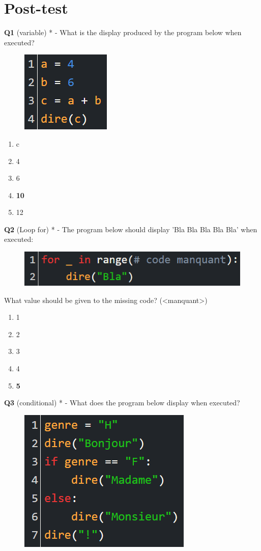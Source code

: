 \documentclass[14pt]{extarticle}
\begin{document}
\section{Post-test}
\textbf{Q1} (variable) * - What is the display produced by the program below when executed?
\begin{figure}[H]
    \centering
    \includegraphics[width=0.25\linewidth]{images/posttest/_Q1.png}
\end{figure}

\begin{enumerate}[label=\alph*)]
    \item c
    \item 4
    \item 6
    \item \textbf{10}
    \item 12
\end{enumerate}
\newpage
\textbf{Q2} (Loop for) * - The program below should display 'Bla Bla Bla Bla Bla' when executed:
\begin{figure}[H]
    \centering
    \includegraphics[width=0.7\linewidth]{images/posttest/_Q2.png}
\end{figure}
What value should be given to the missing code? (<manquant>)
\begin{enumerate}[label=\alph*)]
    \item 1
    \item 2
    \item 3
    \item 4
    \item \textbf{5}
\end{enumerate}
\newpage
\textbf{Q3} (conditional) * -
What does the program below display when executed?
\begin{figure}[H]
    \centering
    \includegraphics[width=0.45\linewidth]{images/posttest/_Q3.png}
\end{figure}
\end{document}
